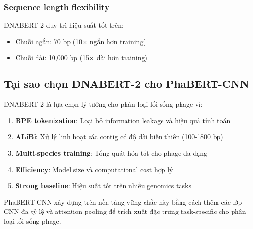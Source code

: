 \subsubsection{Sequence length flexibility}

DNABERT-2 duy trì hiệu suất tốt trên:
\begin{itemize}
    \item Chuỗi ngắn: 70 bp (10× ngắn hơn training)
    \item Chuỗi dài: 10,000 bp (15× dài hơn training)
\end{itemize}

\subsection{Tại sao chọn DNABERT-2 cho PhaBERT-CNN}

DNABERT-2 là lựa chọn lý tưởng cho phân loại lối sống phage vì:

\begin{enumerate}
    \item \textbf{BPE tokenization}: Loại bỏ information leakage và hiệu quả tính toán
    \item \textbf{ALiBi}: Xử lý linh hoạt các contig có độ dài biến thiên (100-1800 bp)
    \item \textbf{Multi-species training}: Tổng quát hóa tốt cho phage đa dạng
    \item \textbf{Efficiency}: Model size và computational cost hợp lý
    \item \textbf{Strong baseline}: Hiệu suất tốt trên nhiều genomics tasks
\end{enumerate}

PhaBERT-CNN xây dựng trên nền tảng vững chắc này bằng cách thêm các lớp CNN đa tỷ lệ và attention pooling để trích xuất đặc trưng task-specific cho phân loại lối sống phage.
